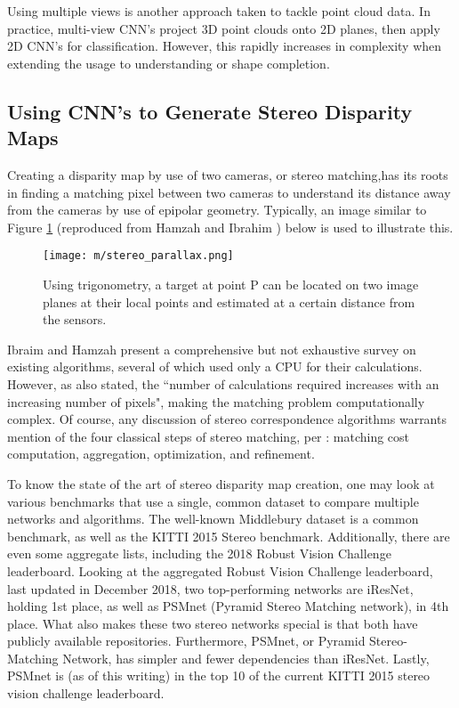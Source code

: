 Using multiple views is another approach taken to tackle point cloud data. In practice, multi-view CNN's project 3D point clouds onto 2D planes, then apply 2D CNN's for classification. However, this rapidly increases in complexity when extending the usage to understanding or shape completion. 

\subsection{Using CNN's to Generate Stereo Disparity Maps}
Creating a disparity map by use of two cameras, or stereo matching,has its roots in finding a matching pixel between two cameras to understand its distance away from the cameras by use of epipolar geometry. Typically, an image similar to Figure \ref{stereo_intro} (reproduced from Hamzah and Ibrahim \cite{hamzah_literature_2016}) below is used to illustrate this. 

\begin{figure}[ht] %
    \centering
    \texttt{[image: m/stereo\_parallax.png]}
    \label{stereo_intro}
    \caption{Using trigonometry, a target at point P can be located on two image planes at their local points and estimated at a certain distance from the sensors.}
\end{figure}

Ibraim and Hamzah \cite{hamzah_literature_2016} present a comprehensive but not exhaustive survey on existing algorithms, several of which used only a CPU for their calculations. However, as also stated, the ``number of calculations required increases with an increasing number of pixels", making the matching problem computationally complex. Of course, any discussion of stereo correspondence algorithms warrants mention of the four classical steps of stereo matching, per \cite{scharstein2002taxonomy}: matching cost computation, aggregation, optimization, and refinement.

To know the state of the art of stereo disparity map creation, one may look at various benchmarks that use a single, common dataset to compare multiple networks and algorithms. The well-known Middlebury \cite{scharstein2014high,middlebury_leaderboard} dataset is a common benchmark, as well as the KITTI \cite{geiger_are_2012,kitti_stereo_board} 2015 Stereo benchmark. Additionally, there are even some aggregate lists, including the 2018 Robust Vision Challenge \cite{rvc_leaderboard} leaderboard. Looking at the aggregated Robust Vision Challenge leaderboard, last updated in December 2018, two top-performing networks are iResNet, holding 1st place, as well as PSMnet (Pyramid Stereo Matching network), in 4th place. What also makes these two stereo networks special is that both have publicly available repositories. Furthermore, PSMnet, or Pyramid Stereo-Matching Network, has simpler and fewer dependencies than iResNet. Lastly, PSMnet is (as of this writing) in the top 10 of the current KITTI 2015 stereo vision challenge leaderboard. 

